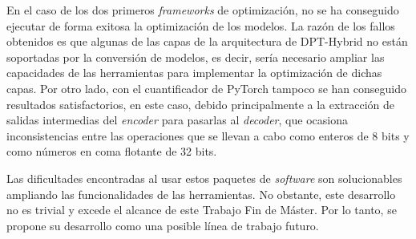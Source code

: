 En el caso de los dos primeros \textit{frameworks} de optimización, no se ha conseguido ejecutar de forma exitosa la optimización de los modelos. La razón de los fallos obtenidos es que algunas de las capas de la arquitectura de DPT-Hybrid no están soportadas por la conversión de modelos, es decir, sería necesario ampliar las capacidades de las herramientas para implementar la optimización de dichas capas. Por otro lado, con el cuantificador de PyTorch tampoco se han conseguido resultados satisfactorios, en este caso, debido principalmente a la extracción de salidas intermedias del \textit{encoder} para pasarlas al \textit{decoder}, que ocasiona inconsistencias entre las operaciones que se llevan a cabo como enteros de 8 bits y como números en coma flotante de 32 bits.

Las dificultades encontradas al usar estos paquetes de \textit{software} son solucionables ampliando las funcionalidades de las herramientas. No obstante, este desarrollo no es trivial y excede el alcance de este Trabajo Fin de Máster. Por lo tanto, se propone su desarrollo como una posible línea de trabajo futuro.




\clearpage